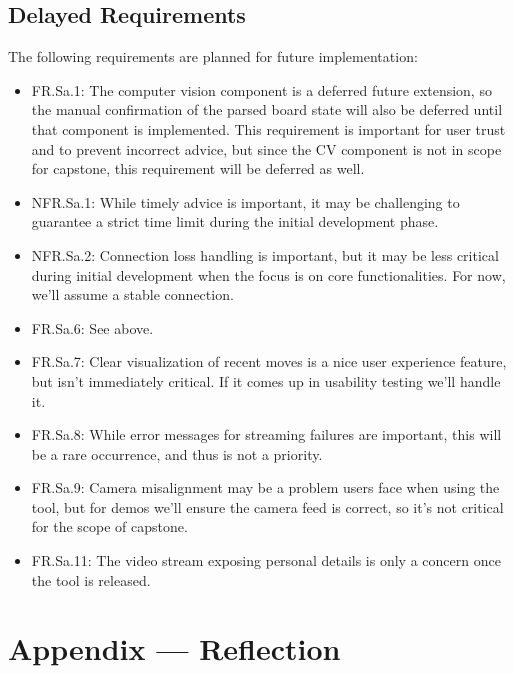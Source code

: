 \documentclass{article}
\begin{document}
\subsection{Delayed Requirements}\label{subsec:delayed-requirements}
The following requirements are planned for future implementation:
\begin{itemize}
    \item FR.Sa.1: The computer vision component is a deferred future extension, so the manual confirmation of the parsed board state will also be deferred until that component is implemented.
           This requirement is important for user trust and to prevent incorrect advice, but since the CV component is not in scope for capstone, this requirement will be deferred as well.
    \item NFR.Sa.1: While timely advice is important, it may be challenging to guarantee a strict time limit during the initial development phase.
    \item NFR.Sa.2: Connection loss handling is important, but it may be less critical during initial development when the focus is on core functionalities.
          For now, we'll assume a stable connection.
    \item FR.Sa.6: See above.
    \item FR.Sa.7: Clear visualization of recent moves is a nice user experience feature, but isn't immediately critical. If it comes up in usability testing we'll handle it.
    \item FR.Sa.8: While error messages for streaming failures are important, this will be a rare occurrence, and thus is not a priority.
    \item FR.Sa.9: Camera misalignment may be a problem users face when using the tool, but for demos we'll ensure the camera feed is correct, so it's not critical for the scope of capstone.
    \item FR.Sa.11: The video stream exposing personal details is only a concern once the tool is released.
\end{itemize}


\newpage{}

\section*{Appendix --- Reflection}


% 
\end{document}
